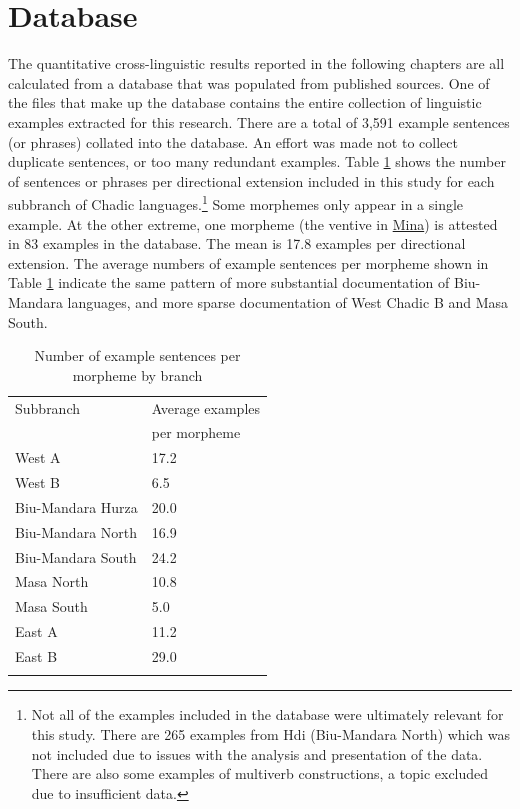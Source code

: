 \section{Database} \label{sec:database}

The quantitative cross-linguistic results reported in the following chapters are all calculated from a database that was populated from published sources. One of the files that make up the database contains the entire collection of linguistic examples extracted for this research. There are a total of 3,591 example sentences (or phrases) collated into the database. An effort was made not to collect duplicate sentences, or too many redundant examples. Table \ref{tab:examples} shows the number of sentences or phrases per directional extension included in this study for each subbranch of Chadic languages.\footnote{Not all of the examples included in the database were ultimately relevant for this study. There are 265 examples from Hdi (Biu-Mandara North) which was not included due to issues with the analysis and presentation of the data. There are also some examples of multiverb constructions, a topic excluded due to insufficient data.} Some morphemes only appear in a single example. At the other extreme, one morpheme (the ventive in \hyperref[mina]{Mina}) is attested in 83 examples in the database. The mean is 17.8 examples per directional extension. The average numbers of example sentences per morpheme shown in Table \ref{tab:examples} indicate the same pattern of more substantial documentation of Biu-Mandara languages, and more sparse documentation of West Chadic B and Masa South.

\begin{table}
	\caption{Number of example sentences per morpheme by branch}
	\label{tab:examples}
	\begin{tabular}{ll} %
		\lsptoprule
		Subbranch &  Average examples \\ & per morpheme \\
		\midrule
		West A            &       17.2 \\
		West B            &        6.5 \\
		Biu-Mandara Hurza &       20.0 \\
		Biu-Mandara North &       16.9 \\
		Biu-Mandara South &       24.2 \\
		Masa North        &       10.8 \\
		Masa South        &        5.0 \\
		East A            &       11.2 \\
		East B            &       29.0 \\
		\lspbottomrule
	\end{tabular}
\end{table}

